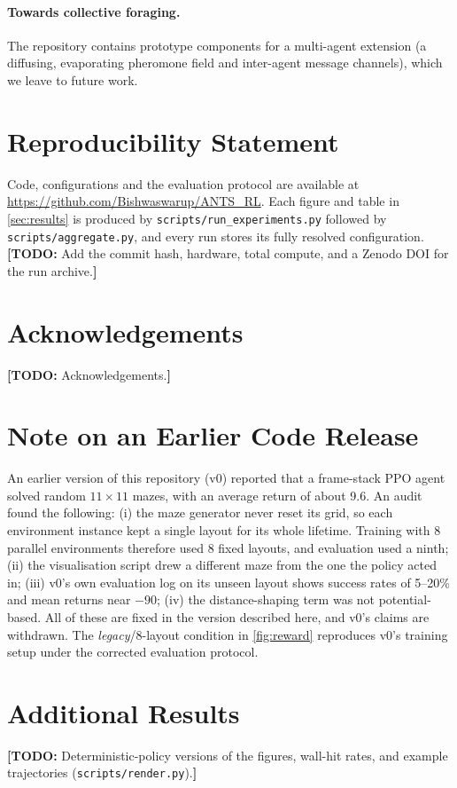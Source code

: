 \documentclass[11pt]{article}
\newcommand{\todo}[1]{{\color{red!75!black}\textbf{[TODO:} #1\textbf{]}}}
\begin{document}
\paragraph{Towards collective foraging.} The repository contains
prototype components for a multi-agent extension (a diffusing,
evaporating pheromone field and inter-agent message channels), which we
leave to future work.

\section*{Reproducibility Statement}
Code, configurations and the evaluation protocol are available at
\url{https://github.com/Bishwaswarup/ANTS_RL}. Each figure and table in
\cref{sec:results} is produced by \texttt{scripts/run\_experiments.py} followed
by \texttt{scripts/aggregate.py}, and every run stores its fully resolved
configuration. \todo{Add the commit hash, hardware, total compute, and a
Zenodo DOI for the run archive.}

\section*{Acknowledgements}
\todo{Acknowledgements.}




\appendix
\section{Note on an Earlier Code Release}\label{app:errata}

An earlier version of this repository (v0) reported that a frame-stack PPO
agent solved random $11\times11$ mazes, with an average return of about 9.6.
An audit found the following:
(i) the maze generator never reset its grid, so each environment instance
kept a single layout for its whole lifetime. Training with 8 parallel
environments therefore used 8 fixed layouts, and evaluation used a ninth;
(ii) the visualisation script drew a different maze from the one the
policy acted in;
(iii) v0's own evaluation log on its unseen layout shows success rates of
5--20\% and mean returns near $-90$;
(iv) the distance-shaping term was not potential-based.
All of these are fixed in the version described here, and v0's claims are
withdrawn. The \emph{legacy}/8-layout condition in \cref{fig:reward} reproduces v0's
training setup under the corrected evaluation protocol.

\section{Additional Results}
\todo{Deterministic-policy versions of the figures, wall-hit rates, and
example trajectories (\texttt{scripts/render.py}).}
\end{document}
